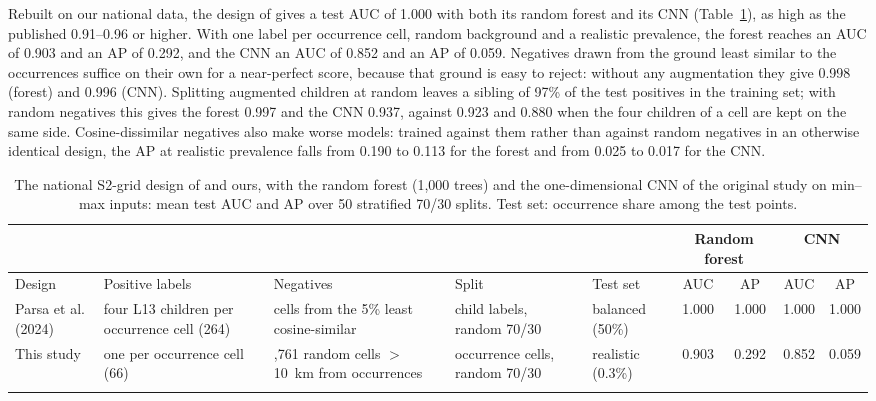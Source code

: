 \documentclass[pdflatex,sn-apa]{sn-jnl}
\begin{document}
Rebuilt on our national data, the design of \citet{Parsa2024} gives a test AUC of 1.000 with both its random forest and its CNN (Table~\ref{tab:nat-design}), as high as the published 0.91--0.96 or higher. With one label per occurrence cell, random background and a realistic prevalence, the forest reaches an AUC of 0.903 and an AP of 0.292, and the CNN an AUC of 0.852 and an AP of 0.059. Negatives drawn from the ground least similar to the occurrences suffice on their own for a near-perfect score, because that ground is easy to reject: without any augmentation they give 0.998 (forest) and 0.996 (CNN). Splitting augmented children at random leaves a sibling of 97\% of the test positives in the training set; with random negatives this gives the forest 0.997 and the CNN 0.937, against 0.923 and 0.880 when the four children of a cell are kept on the same side. Cosine-dissimilar negatives also make worse models: trained against them rather than against random negatives in an otherwise identical design, the AP at realistic prevalence falls from 0.190 to 0.113 for the forest and from 0.025 to 0.017 for the CNN.

\begin{table}[t]
\caption{The national S2-grid design of \citet{Parsa2024} and ours, with the random forest (1,000 trees) and the one-dimensional CNN of the original study on min--max inputs: mean test AUC and AP over 50 stratified 70/30 splits. Test set: occurrence share among the test points.}\label{tab:nat-design}
\scriptsize
\setlength{\tabcolsep}{2.5pt}
\begin{tabular*}{\textwidth}{@{\extracolsep\fill}>{\raggedright\arraybackslash}p{1.7cm}>{\raggedright\arraybackslash}p{2.4cm}>{\raggedright\arraybackslash}p{2.5cm}>{\raggedright\arraybackslash}p{1.8cm}>{\raggedright\arraybackslash}p{1.3cm}cccc}
\toprule
 & & & & & \multicolumn{2}{c}{Random forest} & \multicolumn{2}{c}{CNN} \\
\cmidrule{6-7}\cmidrule{8-9}
Design & Positive labels & Negatives & Split & Test set & AUC & AP & AUC & AP \\
\midrule
Parsa et al. (2024) & four L13 children per occurrence cell (264) & 264 cells from the 5\% least cosine-similar & child labels, random 70/30 & balanced (50\%) & 1.000 & 1.000 & 1.000 & 1.000 \\
This study & one per occurrence cell (66) & 34,761 random cells $>$10~km from occurrences & occurrence cells, random 70/30 & realistic (0.3\%) & 0.903 & 0.292 & 0.852 & 0.059 \\
\botrule
\end{tabular*}
\end{table}
\end{document}

